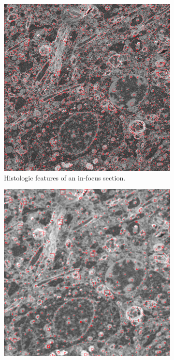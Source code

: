 \documentclass[sigconf,nonacm]{acmart}
\begin{document}
\begin{figure}
     \centering
     \begin{subfigure}[b]{0.5\textwidth}
         \centering
         \includegraphics[width=1\linewidth]{in_focus.png}
         \caption{Histologic features of an in-focus section.}
         \label{subfig:infocus}
     \end{subfigure}
     \par\bigskip
     \begin{subfigure}[b]{0.5\textwidth}
         \centering
        \includegraphics[width=1\linewidth]{out_of_focus.png}

\end{subfigure}
\end{figure}
\end{document}
